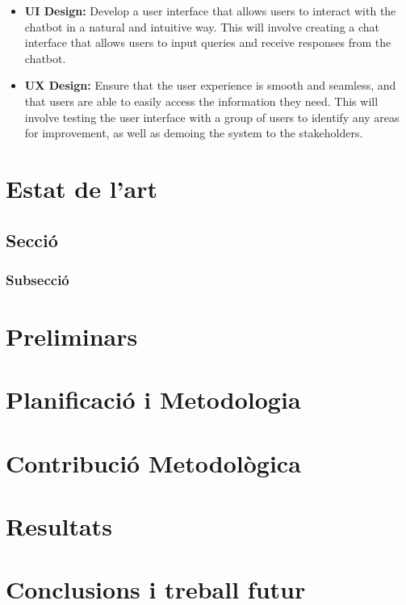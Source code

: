 \documentclass[a4paper,12pt,twoside]{ThesisStyle}
\begin{document}
\begin{itemize}
  \item \textbf{UI Design:} Develop a user interface that allows users to interact with the chatbot in a natural and intuitive way. This will involve creating a chat interface that allows users to input queries and receive responses from the chatbot.
  \item \textbf{UX Design:} Ensure that the user experience is smooth and seamless, and that users are able to easily access the information they need. This will involve testing the user interface with a group of users to identify any areas for improvement, as well as demoing the system to the stakeholders.
\end{itemize}



\chapter{Estat de l'art}
\label{cap:estat}

\section{Secció}

\subsection{Subsecció}

\chapter{Preliminars}
\label{cap:prelim}

\chapter{Planificació i Metodologia}
\label{cap:plan}

\chapter{Contribució Metodològica}
\label{cap:contrib}

\chapter{Resultats}
\label{cap:result}

\chapter{Conclusions i treball futur}
\label{cap:concl}

\backmatter


%

% 



\end{document}
